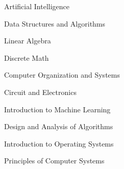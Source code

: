 

\begin{cventries}

  \cvdescription
    {} %
    {} %
    {} %
    {} %
    {
    \begin{cvitems} %
        \vspace*{-4.0mm} %
        \begin{multicols}{2} %
        \item Artificial Intelligence
        \item Data Structures and Algorithms
        \item Linear Algebra
        \item Discrete Math
        \item Computer Organization and Systems
        \item Circuit and Electronics
        \item Introduction to Machine Learning
        \item Design and Analysis of Algorithms
        \item Introduction to Operating Systems
        \item Principles of Computer Systems
        \end{multicols}
    \end{cvitems}
    }

\end{cventries}
\vspace*{-4.0mm}
